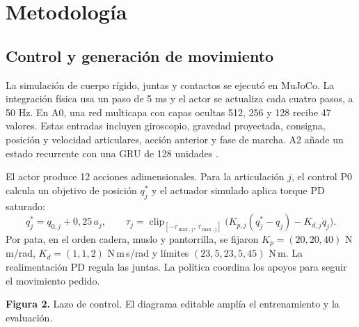 \documentclass[11pt]{article}
\begin{document}
\newpage
\section{Metodología}
\subsection{Control y generación de movimiento}
La simulación de cuerpo rígido, juntas y contactos se ejecutó en MuJoCo. La integración física usa un paso de 5 ms y el actor se actualiza cada cuatro pasos, a 50 Hz. En A0, una red multicapa con capas ocultas 512, 256 y 128 recibe 47 valores. Estas entradas incluyen giroscopio, gravedad proyectada, consigna, posición y velocidad articulares, acción anterior y fase de marcha. A2 añade un estado recurrente con una GRU de 128 unidades \cite{cho2014}.

El actor produce 12 acciones adimensionales. Para la articulación \(j\), el control P0 calcula un objetivo de posición \(q_j^*\) y el actuador simulado aplica torque PD saturado:
\[
 q_j^* = q_{0,j}+0{,}25\,a_j,\qquad
 \tau_j = \operatorname{clip}_{[-\tau_{\max,j},\,\tau_{\max,j}]}
       \bigl(K_{p,j}(q_j^*-q_j)-K_{d,j}\dot q_j\bigr).
\]
Por pata, en el orden cadera, muslo y pantorrilla, se fijaron \(K_p=(20,20,40)\) N\,m/rad, \(K_d=(1,1,2)\) N\,m\,s/rad y límites \((23{,}5,23{,}5,45)\) N\,m. La realimentación PD regula las juntas. La política coordina los apoyos para seguir el movimiento pedido.

\begin{center}

\footnotesize\textbf{Figura 2.} Lazo de control. El diagrama editable amplía el entrenamiento y la evaluación.
\end{center}
\end{document}
